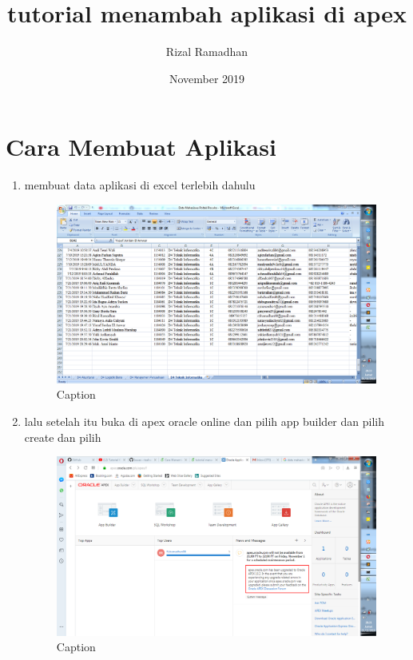\documentclass{article}
\title{tutorial menambah aplikasi di apex}
\author{Rizal Ramadhan}
\date{November 2019}
\begin{document}
\maketitle

\section{Cara Membuat Aplikasi}
\begin{enumerate}
\item membuat data aplikasi di excel terlebih dahulu

\begin{figure}[!htbp]
    \centering
    \includegraphics[scale=0.4]{gambar/Capture1.PNG}
    \caption{Caption}
    \label{fig:my_label}
\end{figure}

\item lalu setelah itu buka di apex oracle online dan pilih app builder dan pilih create dan pilih 

\begin{figure}[!htbp]
    \centering
    \includegraphics[scale=0.4]{gambar/Capture2.PNG}
    \caption{Caption}
    \label{fig:my_label}
\end{figure}


\end{enumerate}
\end{document}
